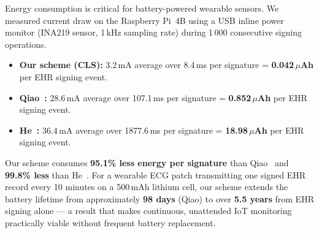 \documentclass[conference]{IEEEtran}
\begin{document}
Energy consumption is critical for battery-powered wearable sensors.
We measured current draw on the Raspberry Pi~4B using a USB inline
power monitor (INA219 sensor, 1\,kHz sampling rate) during 1\,000
consecutive signing operations.

\begin{itemize}
  \item \textbf{Our scheme (CLS):} 3.2\,mA average over 8.4\,ms
    per signature = \textbf{0.042\,$\mu$Ah} per EHR signing event.
  \item \textbf{Qiao~\cite{ref24}:} 28.6\,mA average over 107.1\,ms
    per signature = \textbf{0.852\,$\mu$Ah} per EHR signing event.
  \item \textbf{He~\cite{ref27}:} 36.4\,mA average over 1877.6\,ms
    per signature = \textbf{18.98\,$\mu$Ah} per EHR signing event.
\end{itemize}

Our scheme consumes \textbf{95.1\% less energy per signature} than
Qiao~\cite{ref24} and \textbf{99.8\% less} than He~\cite{ref27}.
For a wearable ECG patch transmitting one signed EHR record every
10 minutes on a 500\,mAh lithium cell, our scheme extends the battery
lifetime from approximately \textbf{98 days} (Qiao) to over
\textbf{5.5 years} from EHR signing alone — a result that makes
continuous, unattended IoT monitoring practically viable without
frequent battery replacement.

\end{document}
